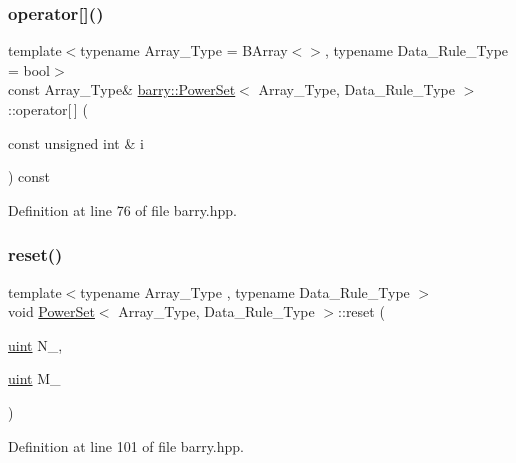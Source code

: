 \subsubsection{\texorpdfstring{operator[]()}{operator[]()}}
{\footnotesize\ttfamily template$<$typename Array\+\_\+\+Type  = B\+Array$<$$>$, typename Data\+\_\+\+Rule\+\_\+\+Type  = bool$>$ \\
const Array\+\_\+\+Type\& \hyperlink{classbarry_1_1_power_set}{barry\+::\+Power\+Set}$<$ Array\+\_\+\+Type, Data\+\_\+\+Rule\+\_\+\+Type $>$\+::operator\mbox{[}$\,$\mbox{]} (\begin{DoxyParamCaption}\item[{const unsigned int \&}]{i }\end{DoxyParamCaption}) const\hspace{0.3cm}{\ttfamily [inline]}}



Definition at line 76 of file barry.\+hpp.

\mbox{\label{classbarry_1_1_power_set_aba11dd8802cd2eb529c7c30b55994248}} 
\subsubsection{\texorpdfstring{reset()}{reset()}}
{\footnotesize\ttfamily template$<$typename Array\+\_\+\+Type , typename Data\+\_\+\+Rule\+\_\+\+Type $>$ \\
void \hyperlink{classbarry_1_1_power_set}{Power\+Set}$<$ Array\+\_\+\+Type, Data\+\_\+\+Rule\+\_\+\+Type $>$\+::reset (\begin{DoxyParamCaption}\item[{\hyperlink{namespacebarry_a11dfc53ddb4672278319aa04f1e09a6c}{uint}}]{N\+\_\+,  }\item[{\hyperlink{namespacebarry_a11dfc53ddb4672278319aa04f1e09a6c}{uint}}]{M\+\_\+ }\end{DoxyParamCaption})\hspace{0.3cm}{\ttfamily [inline]}}



Definition at line 101 of file barry.\+hpp.

\mbox{\label{classbarry_1_1_power_set_af8b336d7b958c44bb69cd24d7a462ed8}} 
